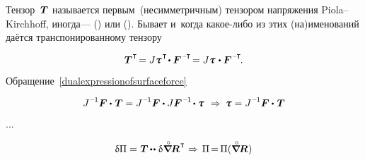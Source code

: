 \begin{otherlanguage}{russian}
\vspace{-0.2em} Тензор~${\hspace{.1ex}\bm{T}}$ называется первым~(несимметричным) тензором напряжения Piola--Kirchhoff, иногда\:---  () или  (). Бывает и~когда какое\hbox{-}либо из этих (на)именований даётся транспонированному тензору

\nopagebreak\vspace{-0.1em}\begin{equation*}
\firstpiolakirchhoffstress^{\hspace{.1ex}\T} \hspace{-0.32ex}
= J \cauchystress^{\hspace{.16ex}\T} \hspace{-0.32ex} \dotp \bm{F}^{\hspace{.1ex}\expminusT} \hspace{-0.32ex}
= J \cauchystress \hspace{.16ex} \dotp \bm{F}^{\hspace{.1ex}\expminusT} \hspace{-0.25ex}.
\end{equation*}

Обращение~\eqref{dualexpressionofsurfaceforce}

\begin{equation*}
J^{\hspace{.12ex}\expminusone} \bm{F} \dotp \hspace{.16ex} \firstpiolakirchhoffstress = J^{\hspace{.12ex}\expminusone} \bm{F} \dotp J \bm{F}^{\hspace{.16ex}\expminusone} \hspace{-0.2ex} \dotp \cauchystress
\:\,\Rightarrow\:
\cauchystress = J^{\hspace{.12ex}\expminusone} \bm{F} \dotp \hspace{.16ex} \firstpiolakirchhoffstress
\end{equation*}

...



\nopagebreak\vspace{-0.2em}\begin{equation}
\variation{\Pi} = \hspace{.1ex} \firstpiolakirchhoffstress \hspace{-0.12ex} \dotdotp \hspace{.1ex} \variation{\hspace{.1ex} \boldnablacircled \hspace{-0.16ex} \bm{R}^{\hspace{0.12ex}\T}}
\hspace{.1ex} \Rightarrow \hspace{.32ex}
\Pi \hspace{-0.32ex}=\hspace{-0.25ex} \Pi(\boldnablacircled \hspace{-0.16ex} \bm{R}\hspace{.1ex})
\end{equation}


\end{otherlanguage}
